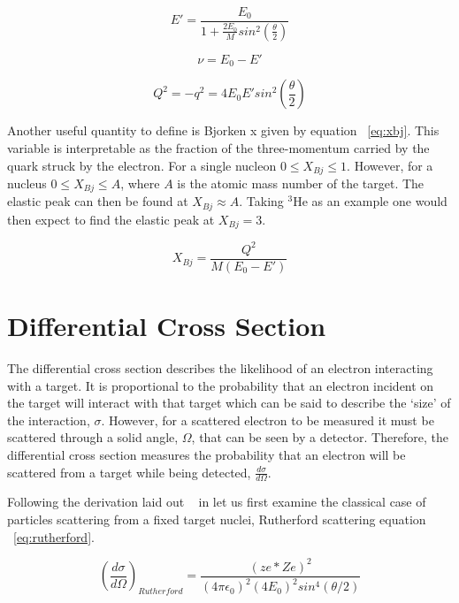 \begin{equation} \label{eq:E'}
	E' = \frac{E_0}{1+\frac{2E_0}{M}sin^2\left(\frac{\theta}{2}\right)}
\end{equation}

\begin{equation} \label{eq:nu}
	\nu = E_0-E'
\end{equation}

\begin{equation} \label{eq:Q^2}
	Q^2 = -q^2 = 4E_0E'sin^2\left(\frac{\theta}{2}\right)
\end{equation}

Another useful quantity to define is Bjorken x given by equation ~\ref{eq:xbj}. This variable is interpretable as the fraction of the three-momentum carried by the quark struck by the electron. For a single nucleon $0 \leq X_{Bj} \leq 1$. However, for a nucleus $0 \leq X_{Bj} \leq A$, where $A$ is the atomic mass number of the target. The elastic peak can then be found at $X_{Bj} \approx A$. Taking $^3$He as an example one would then expect to find the elastic peak at $X_{Bj} = 3$.

\begin{equation} \label{eq:xbj}
	X_{Bj} = \frac{Q^2}{M(E_0-E')} 
\end{equation}

\section{Differential Cross Section}
\label{sec:xs}

The differential cross section describes the likelihood of an electron interacting with a target. It is proportional to the probability that an electron incident on the target will interact with that target which can be said to describe the `size' of the interaction, $\sigma$. However, for a scattered electron to be measured it must be scattered through a solid angle, $\Omega$, that can be seen by a detector. Therefore, the differential cross section measures the probability that an electron will be scattered from a target while being detected, $\frac{d\sigma}{d\Omega}$.

Following the derivation laid out ~\cite{Book:Povh} in let us first examine the classical case of particles scattering from a fixed target nuclei, Rutherford scattering equation ~\ref{eq:rutherford}.   

\begin{equation} \label{eq:rutherford}
	\left(\frac{d\sigma}{d\Omega}\right)_{Rutherford} = \frac{\left(ze*Ze\right)^2}{(4\pi\epsilon_0)^2(4E_0)^2sin^4(\theta/2)}
\end{equation}



